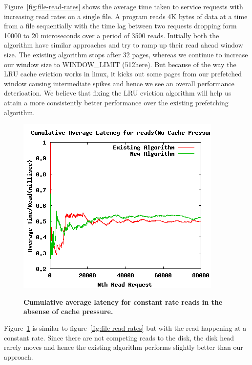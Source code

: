 \documentclass[twocolumn,10pt]{article}
\begin{document}
Figure~\ref{fig:file-read-rates} shows the average time taken to service requests with increasing read rates on a single file. A program reads 4K bytes of data at a time from a file sequentially with the time lag between two requests dropping form 10000 to 20 microseconds over a period of 3500 reads. Initially both the algorithm have similar approaches and try to ramp up their read ahead window size. The existing algorithm stops after 32 pages, whereas we continue to increase our window size to WINDOW\_LIMIT (512here). But because of the way the LRU cache eviction works in linux, it kicks out some pages from our prefetched window causing intermediate spikes and hence we see an overall performance deterioation. We believe that fixing the LRU eviction algorithm will help us attain a more consistently better performance over the existing prefetching algorithm.

\begin{figure}[t!!]
\centering \resizebox{!}{2.8in}
{\includegraphics{file-copy-nocp-rates.png}}
\caption{\small \bf Cumulative average latency for constant rate reads in the absense of cache pressure.}
\label{fig:file-copy-nocp-rates}
\end{figure}

Figure~\ref{fig:file-copy-nocp-rates} is similar to figure~\ref{fig:file-read-rates} but with the read happening at a constant rate. Since there are not competing reads to the disk, the disk head rarely moves and hence the existing algorithm performs slightly better than our approach.
\end{document}
